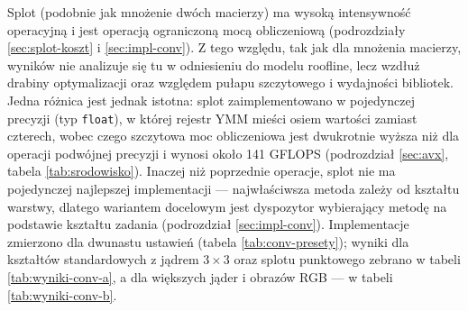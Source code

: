 \documentclass[a4paper,12pt]{book} %
\begin{document}
Splot (podobnie jak mnożenie dwóch macierzy) ma wysoką intensywność operacyjną i jest operacją ograniczoną mocą obliczeniową (podrozdziały \ref{sec:splot-koszt} i \ref{sec:impl-conv}). Z tego względu, tak jak dla mnożenia macierzy, wyników nie analizuje się tu w odniesieniu do modelu roofline, lecz wzdłuż drabiny optymalizacji oraz względem pułapu szczytowego i wydajności bibliotek. Jedna różnica jest jednak istotna: splot zaimplementowano w pojedynczej precyzji (typ \texttt{float}), w której rejestr YMM mieści osiem wartości zamiast czterech, wobec czego szczytowa moc obliczeniowa jest dwukrotnie wyższa niż dla operacji podwójnej precyzji i wynosi około 141 GFLOPS (podrozdział \ref{sec:avx}, tabela \ref{tab:srodowisko}). Inaczej niż poprzednie operacje, splot nie ma pojedynczej najlepszej implementacji --- najwłaściwsza metoda zależy od kształtu warstwy, dlatego wariantem docelowym jest dyspozytor wybierający metodę na podstawie kształtu zadania (podrozdział \ref{sec:impl-conv}). Implementacje zmierzono dla dwunastu ustawień (tabela \ref{tab:conv-presety}); wyniki dla kształtów standardowych z jądrem $3 \times 3$ oraz splotu punktowego zebrano w tabeli \ref{tab:wyniki-conv-a}, a dla większych jąder i obrazów RGB --- w tabeli \ref{tab:wyniki-conv-b}.
\end{document}
